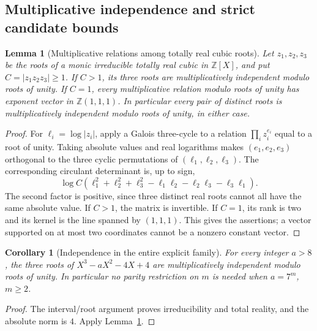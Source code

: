 \documentclass[11pt,a4paper]{article}
\newtheorem{lemma}[theorem]{Lemma}\newtheorem{proposition}[theorem]{Proposition}
\newtheorem{corollary}[theorem]{Corollary}\newtheorem{mainthm}[theorem]{Theorem}
\theoremstyle{definition}\newtheorem{definition}[theorem]{Definition}
\theoremstyle{remark}\newtheorem{remark}[theorem]{Remark}
\begin{document}
\subsection{Multiplicative independence and strict candidate bounds}

\begin{lemma}[Multiplicative relations among totally real cubic roots]
\label{R17:lem:new-cubic-independence}
Let $z_1,z_2,z_3$ be the roots of a monic irreducible totally real cubic
in $\mathbb Z[X]$, and put $C=|z_1z_2z_3|\ge1$.
If $C>1$, its three roots are multiplicatively independent modulo roots
of unity. If $C=1$, every multiplicative relation modulo roots of unity
has exponent vector in $\mathbb Z(1,1,1)$. In particular every pair of
distinct roots is multiplicatively independent modulo roots of unity,
in either case.
\end{lemma}
\begin{proof}
For $\ell_i=\log|z_i|$, apply a Galois three-cycle to a relation
$\prod_i z_i^{e_i}$ equal to a root of unity. Taking absolute values and
real logarithms makes $(e_1,e_2,e_3)$ orthogonal to the three cyclic
permutations of $(\ell_1,\ell_2,\ell_3)$.
The corresponding circulant determinant is, up to sign,
\[
 \log C\left(\ell_1^2+\ell_2^2+\ell_3^2
       -\ell_1\ell_2-\ell_2\ell_3-\ell_3\ell_1\right).
\]
The second factor is positive, since three distinct real roots cannot
all have the same absolute value. If $C>1$, the matrix is invertible.
If $C=1$, its rank is two and its kernel is the line spanned by
$(1,1,1)$. This gives the assertions; a vector supported on at most two
coordinates cannot be a nonzero constant vector.
\end{proof}

\begin{corollary}[Independence in the entire explicit family]
\label{R17:cor:new-family-independence}
For every integer $a>8$, the three roots of
$X^3-aX^2-4X+4$ are multiplicatively independent modulo roots of unity.
In particular no parity restriction on $m$ is needed when $a=7^m$,
$m\ge2$.
\end{corollary}
\begin{proof}
The interval/root argument proves irreducibility and total reality,
and the absolute norm is $4$. Apply
Lemma~\ref{R17:lem:new-cubic-independence}.
\end{proof}
\end{document}
